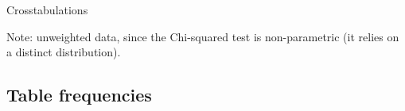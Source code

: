 \documentclass[t]{beamer}
\begin{document}
	\begin{frame}[t]{Crosstabulations}
	
	
	Note: unweighted data, since the Chi-squared test is non-parametric (it relies on a distinct distribution).
	
	\end{frame}
	
	
	\subsection{Table frequencies}
\end{document}
